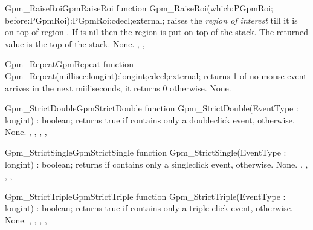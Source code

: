 \begin{functionl}{Gpm\_RaiseRoi}{GpmRaiseRoi}
\Declaration
function Gpm\_RaiseRoi(which:PGpmRoi; before:PGpmRoi):PGpmRoi;cdecl;external;
\Description
{} raises the {\em region of interest}  till it
is on top of region . If  is nil then the region is
put on top of the stack. The returned value is the top of the stack.
\Errors
None.
\SeeAlso
{},
, 
\end{functionl}

\begin{functionl}{Gpm_Repeat}{GpmRepeat}
\Declaration
function Gpm\_Repeat(millisec:longint):longint;cdecl;external;
\Description
{} returns 1 of no mouse event arrives in the next
 miiliseconds, it returns 0 otherwise.
\Errors
None.
\SeeAlso
{}
\end{functionl}

\begin{functionl}{Gpm\_StrictDouble}{GpmStrictDouble}
\Declaration
function Gpm\_StrictDouble(EventType : longint) : boolean;
\Description
{} returns true if  contains only a 
doubleclick event,  otherwise.
\Errors
None.
\SeeAlso
{},
,
,
,
\end{functionl}

\begin{functionl}{Gpm\_StrictSingle}{GpmStrictSingle}
\Declaration
function Gpm\_StrictSingle(EventType : longint) : boolean;
\Description
{} returns  if  contains only a 
singleclick event,  otherwise. 
\Errors
None.
\SeeAlso
{},
,
, 
,
\end{functionl}

\begin{functionl}{Gpm\_StrictTriple}{GpmStrictTriple}
\Declaration
function Gpm\_StrictTriple(EventType : longint) : boolean;
\Description
{} returns true if  contains only a
triple click event,  otherwise.
\Errors
None.
\SeeAlso
{},
,
, 
,
\end{functionl}
